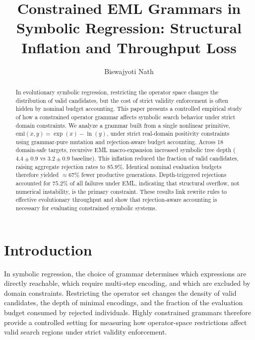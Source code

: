 \documentclass[runningheads]{llncs}
\begin{document}
\title{Constrained EML Grammars in Symbolic Regression: Structural Inflation and Throughput Loss}
\author{Biswajyoti Nath}
\maketitle

\begin{abstract}
In evolutionary symbolic regression, restricting the operator space changes the distribution of valid candidates, but the cost of strict validity enforcement is often hidden by nominal budget accounting. This paper presents a controlled empirical study of how a constrained operator grammar affects symbolic search behavior under strict domain constraints. We analyze a grammar built from a single nonlinear primitive, $\mathrm{eml}(x,y)=\exp(x)-\ln(y)$, under strict real-domain positivity constraints using grammar-pure mutation and rejection-aware budget accounting. Across 18 domain-safe targets, recursive EML macro-expansion increased symbolic tree depth ($4.4\pm0.9$ vs $3.2\pm0.9$ baseline). This inflation reduced the fraction of valid candidates, raising aggregate rejection rates to $85.9\%$. Identical nominal evaluation budgets therefore yielded $\approx 67\%$ fewer productive generations. Depth-triggered rejections accounted for $75.2\%$ of all failures under EML, indicating that structural overflow, not numerical instability, is the primary constraint. These results link rewrite rules to effective evolutionary throughput and show that rejection-aware accounting is necessary for evaluating constrained symbolic systems.
\end{abstract}


\section{Introduction}\label{sec:introduction}

In symbolic regression, the choice of grammar determines which expressions are directly reachable, which require multi-step encoding, and which are excluded by domain constraints. Restricting the operator set changes the density of valid candidates, the depth of minimal encodings, and the fraction of the evaluation budget consumed by rejected individuals. Highly constrained grammars therefore provide a controlled setting for measuring how operator-space restrictions affect valid search regions under strict validity enforcement.
\end{document}
